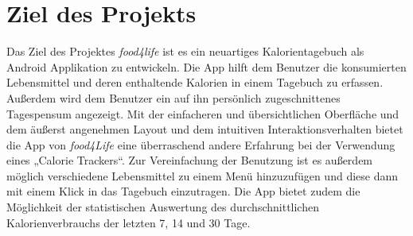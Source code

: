 \section{Ziel des Projekts}
\label{concept}
Das Ziel des Projektes 
\textit{food4life}  ist es ein neuartiges Kalorientagebuch als Android Applikation zu entwickeln. Die App hilft dem Benutzer die konsumierten Lebensmittel und deren enthaltende Kalorien in einem Tagebuch zu erfassen. Außerdem wird dem Benutzer ein auf ihn persönlich zugeschnittenes Tagespensum angezeigt. Mit der einfacheren und übersichtlichen Oberfläche und dem äußerst angenehmen Layout und dem intuitiven Interaktionsverhalten bietet die App von 
\textit{food4Life} eine überraschend andere Erfahrung bei der Verwendung eines „Calorie Trackers“. Zur Vereinfachung der Benutzung ist es außerdem möglich verschiedene Lebensmittel zu einem Menü hinzuzufügen und diese dann mit einem Klick in das Tagebuch einzutragen. Die App bietet zudem die Möglichkeit der statistischen Auswertung des durchschnittlichen Kalorienverbrauchs der letzten 7, 14 und 30 Tage. 

